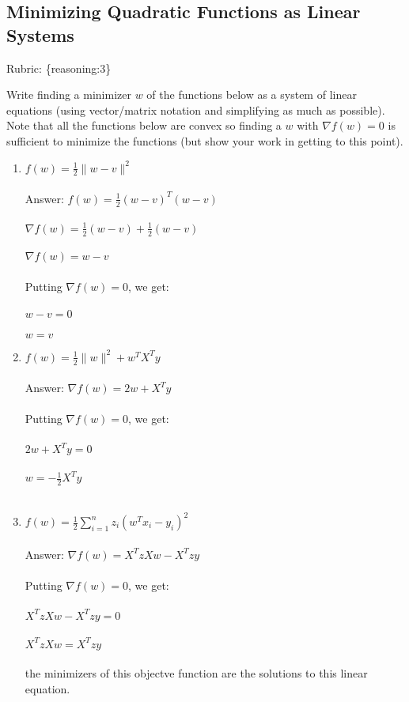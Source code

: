\documentclass{article}
\def\rubric#1{\gre{Rubric: \{#1\}}}{}
\def\blu#1{{\color{blu}#1}}
\def\gre#1{{\color{gre}#1}}
\def\norm#1{\|#1\|}
\def\enum#1{\begin{enumerate}#1\end{enumerate}}
\begin{document}
\subsection{Minimizing Quadratic Functions as Linear Systems}
\rubric{reasoning:3}

Write finding a minimizer $w$ of the functions below as a system of linear equations (using vector/matrix notation and simplifying as much as possible). Note that all the functions below are convex  so finding a $w$ with $\nabla f(w) = 0$ is sufficient to minimize the functions (but show your work in getting to this point).
\enum{
\item $f(w) = \frac{1}{2}\norm{w-v}^2$\\ \\
\blu{Answer:} $ f(w) = \frac{1}{2}(w-v)^T(w-v)$ \\ \\
$ \nabla f(w) = \frac{1}{2}(w-v) + \frac{1}{2}(w-v)$ \\ \\
$ \nabla f(w) = w-v$\\ \\ 
Putting $\nabla f(w) = 0$, we get:\\ \\
$w-v=0$\\ \\
$w=v$ \\
\item $f(w) = \frac{1}{2}\norm{w}^2 + w^TX^Ty$ \\ \\
\blu{Answer:} $\nabla f(w) = 2w + X^Ty $ \\ \\
Putting $\nabla f(w) = 0$, we get: \\ \\
$ 2w + X^Ty = 0$ \\ \\
$w = -\frac{1}{2}X^Ty$ \\ \\
\item $f(w) = \frac{1}{2}\sum_{i=1}^n z_i (w^Tx_i - y_i)^2$ \\ \\
\blu{Answer:} $\nabla f(w) = X^TzXw - X^Tzy$ \\ \\
Putting $\nabla f(w) = 0$, we get: \\ \\
$X^TzXw - X^Tzy = 0$ \\ \\
$X^TzXw  = X^Tzy$ \\ \\
the minimizers of this objectve function are the solutions to this linear equation.
}
\end{document}
